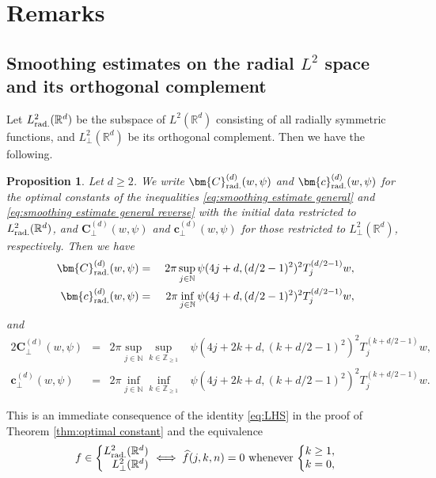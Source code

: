 \documentclass[reqno]{amsart}
\theoremstyle{plain}
\newtheorem{proposition}[theorem]{Proposition}
\numberwithin{equation}{section}
\theoremstyle{remark}
\newcommand{\R}{\mathbb{R}}
\newcommand{\N}{\mathbb{N}}
\newcommand{\Z}{\mathbb{Z}}
\newcommand{\rad}{\textup{rad.}}
\newcommand{\Lrad}{L^2_{\rad}}
\newcommand{\Lperp}{L^2_{\perp}}
\newcommand{\Tjnuf}[3]{T_{#1}^{(#2)}#3}
\newcommand{\const}{\bm{c}}
\newcommand{\Const}{\bm{C}}
\newcommand{\hoconst}{\const}
\newcommand{\hoConst}{\Const}
\newcommand{\hoconstwpdrad}[3]{\hoconst_{\rad}^{(#3)}(#1, #2)}
\newcommand{\hoConstwpdrad}[3]{\hoConst_{\rad}^{(#3)}(#1, #2)}
\newcommand{\hoconstwpdperp}[3]{\hoconst_{\perp}^{(#3)}(#1, #2)}
\newcommand{\hoConstwpdperp}[3]{\hoConst_{\perp}^{(#3)}(#1, #2)}
\newcommand{\fjkn}[4]{\widehat{#1}(#2, #3, #4)}
\begin{document}
\section{Remarks}
\subsection{Smoothing estimates on the radial \texorpdfstring{$L^2$}{L2} space and its orthogonal complement} \label{section:radial initial data}
Let $\Lrad(\R^d)$ be the subspace of $L^2(\R^d)$ consisting of all radially symmetric functions, and $\Lperp(\R^d)$ be its orthogonal complement.
Then we have the following.
\begin{proposition} \label{prop:optimal constant radial}
Let $d \geq 2$.
We write $\hoConstwpdrad{w}{\psi}{d}$ and $\hoconstwpdrad{w}{\psi}{d}$ for the optimal constants of the inequalities \eqref{eq:smoothing estimate general} and \eqref{eq:smoothing estimate general reverse} with the initial data restricted to $\Lrad(\R^d)$, and $\hoConstwpdperp{w}{\psi}{d}$ and $\hoconstwpdperp{w}{\psi}{d}$ for those restricted to $\Lperp(\R^d)$, respectively.
Then we have
		\begin{alignat}{2}
	\hoConstwpdrad{w}{\psi}{d} &={}& 2\pi \sup_{j \in \N} {}&\psi(4j+d, (d/2-1)^2)^2 \Tjnuf{j}{d/2-1}{w} , 
	\label{eq:ho optimal constant C radial} \\
	\hoconstwpdrad{w}{\psi}{d} &={}&2\pi \inf_{j \in \N} {}&\psi(4j+d, (d/2-1)^2)^2 \Tjnuf{j}{d/2-1}{w} ,
	\label{eq:ho optimal constant c radial}
\end{alignat}
and
	\begin{alignat}{2}
	\hoConstwpdperp{w}{\psi}{d} &={}& 2\pi \sup_{j \in \N} \sup_{k \in \Z_{\geq 1}} {}&\psi(4j+2k+d, (k + d/2-1)^2)^2 \Tjnuf{j}{k+d/2-1}{w} , 
	\label{eq:ho optimal constant C perp} \\
	\hoconstwpdperp{w}{\psi}{d} &={}&2\pi \inf_{j \in \N} \inf_{k \in \Z_{\geq 1}} {}&\psi(4j+2k+d, (k + d/2-1)^2)^2 \Tjnuf{j}{k+d/2-1}{w} .
	\label{eq:ho optimal constant c perp}
\end{alignat}
\end{proposition}
This is an immediate consequence of the identity \eqref{eq:LHS} in the proof of Theorem \ref{thm:optimal constant} and the equivalence
\begin{equation}
f \in \mleft\{ \begin{matrix*}[r]
	\Lrad(\R^d) \\
	\Lperp(\R^d)
\end{matrix*} \mright. \iff \fjkn{f}{j}{k}{n} = 0 \text{ whenever } 
\mleft\{\begin{matrix*}[l]
k \geq 1 ,\\
k = 0,
\end{matrix*}
\mright.
\end{equation}
\end{document}
